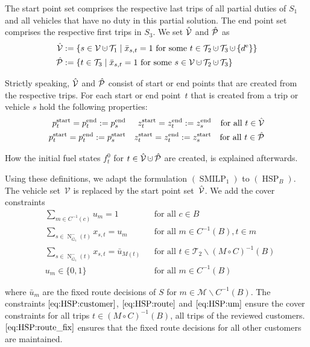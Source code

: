 The start point set comprises the respective last trips of all partial duties of $S_1$ and all vehicles that have no duty in this partial solution. The end point set comprises the respective first trips in $S_3$. We set $\hat{\mathcal{V}}$ and $\hat{\mathcal{P}}$ as
\begin{align*}
	\Vhat & := \left\{s\in\mathcal{V}\cupdot\mathcal{T}_1\mid\bar{x}_{s,t}=1\text{ for some } t\in\mathcal{T}_2\cupdot\mathcal{T}_3\cupdot\left\{\de\right\}\right\} \\
	\Phat & := \left\{t\in\mathcal{T}_3\mid\bar{x}_{s,t}=1\text{ for some } s\in\mathcal{V}\cupdot\mathcal{T}_2\cupdot\mathcal{T}_3\right\}
\end{align*}

Strictly speaking, $\hat{\mathcal{V}}$ and $\hat{\mathcal{P}}$ consist of start or end points that are created from the respective trips. For each start or end point~$t$ that is created from a trip or vehicle $s$ hold the following properties:
\begin{align*}
	p^{\operatorname{start}}_t = p^{\operatorname{end}}_t := p^{\operatorname{end}}_s && z^{\operatorname{start}}_t = z^{\operatorname{end}}_t := z^{\operatorname{end}}_s && \text{for all } t\in\hat{\mathcal{V}} \\
	p^{\operatorname{start}}_t = p^{\operatorname{end}}_t := p^{\operatorname{start}}_s && z^{\operatorname{start}}_t = z^{\operatorname{end}}_t := z^{\operatorname{start}}_s && \text{for all } t\in\hat{\mathcal{P}}
\end{align*}

How the initial fuel states $f^0_t$ for ${t\in\Vhat\cupdot\Phat}$ are created, is explained afterwards.

Using these definitions, we adapt the formulation $(\operatorname{SMILP}_1)$ to $(\operatorname{HSP}_B)$. The vehicle set~$\mathcal{V}$ is replaced by the start point set~$\hat{\mathcal{V}}$. We add the cover constraints
\begin{align}
	& \sum_{m\in C^{-1}(c)} u_m = 1 && \text{for all } c\in B \label{eq:HSP:customer} \\
	& \sum_{s\in\operatorname{N}_{\overline{G}_1}^-(t)} x_{s,t} = u_m && \text{for all } m\in C^{-1}(B),t\in m \label{eq:HSP:route} \\
	& \sum_{s\in\operatorname{N}_{\overline{G}_1}^-(t)} x_{s,t} = \bar{u}_{M(t)} && \text{for all } t\in\mathcal{T}_2\backslash(M\circ C)^{-1}(B) \label{eq:HSP:route_fix} \\
	& u_m\in\{0,1\} && \text{for all } m\in C^{-1}(B) \label{eq:HSP:um}
\end{align}

where $\bar{u}_m$ are the fixed route decisions of $S$ for ${m\in\mathcal{M}\backslash C^{-1}(B)}$. The constraints $\eqref{eq:HSP:customer}$, $\eqref{eq:HSP:route}$ and $\eqref{eq:HSP:um}$ ensure the cover constraints for all trips ${t\in(M\circ C)^{-1}(B)}$, \ie all trips of the reviewed customers. $\eqref{eq:HSP:route_fix}$ ensures that the fixed route decisions for all other customers are maintained. 

